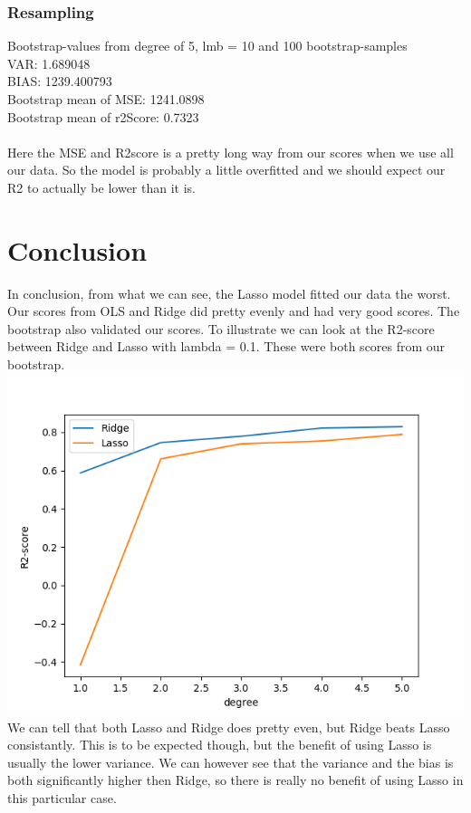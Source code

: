 \documentclass[a4paper,norsk]{article}
\begin{document}
\subsubsection{Resampling}
Bootstrap-values from degree of 5, lmb = 10 and 100 bootstrap-samples
\\VAR: 1.689048
\\BIAS: 1239.400793
\\Bootstrap mean of MSE: 1241.0898
\\Bootstrap mean of r2Score: 0.7323
\\
\\Here the MSE and R2score is a pretty long way from our scores when we use all our data. So the model is probably a little overfitted and we should expect our R2 to actually be lower than it is.
\clearpage
\section{Conclusion}

\par
In conclusion, from what we can see, the Lasso model fitted our data the worst. Our scores from OLS and Ridge did pretty evenly and had very good scores. The bootstrap also validated our scores. To illustrate we can look at the R2-score between Ridge and Lasso with lambda = 0.1. These were both scores from our bootstrap.
\\ \includegraphics[scale=.7]{R2realdata1e-1}
\\We can tell that both Lasso and Ridge does pretty even, but Ridge beats Lasso consistantly. This is to be expected though, but the benefit of using Lasso is usually the lower variance. We can however see that the variance and the bias is both significantly higher then Ridge, so there is really no benefit of using Lasso in this particular case.
\end{document}
